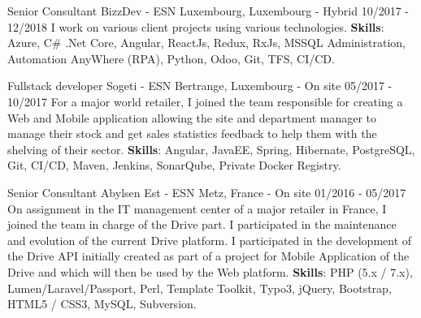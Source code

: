 \begin{cventries}
  \cventry
    {Senior Consultant} %
    {BizzDev - ESN} %
    {Luxembourg, Luxembourg - Hybrid} %
    {10/2017 - 12/2018} %
    {
        I work on various client projects using various technologies.
        \newline
        \textbf{Skills}: Azure, C\# .Net Core, Angular, ReactJs, Redux, RxJs, MSSQL Administration,
        Automation AnyWhere (RPA), Python, Odoo, Git, TFS, CI/CD.
    }

  \cventry
    {Fullstack developer} %
    {Sogeti - ESN} %
    {Bertrange, Luxembourg - On site} %
    {05/2017 - 10/2017} %
    {
        For a major world retailer, I joined the team responsible for creating a 
        Web and Mobile application allowing the site and department manager to manage 
        their stock and get sales statistics feedback to help them with the shelving 
        of their sector.
        \newline
        \textbf{Skills}: Angular, JavaEE, Spring, Hibernate, PostgreSQL, Git, CI/CD,
        Maven, Jenkins, SonarQube, Private Docker Registry.
    }

  \cventry
    {Senior Consultant} %
    {Abylsen Est - ESN} %
    {Metz, France - On site} %
    {01/2016 - 05/2017} %
    {
        On assignment in the IT management center of a major retailer in France, 
        I joined the team in charge of the Drive part. 
        \newline
        I participated in the maintenance and evolution of the current Drive platform. 
        \newline
        I participated in the development of the Drive API initially created as part 
        of a project for Mobile Application of the Drive and which will then be used 
        by the Web platform.
        \newline
        \textbf{Skills}: PHP (5.x / 7.x), Lumen/Laravel/Passport, Perl, Template Toolkit, Typo3,
        jQuery, Bootstrap, HTML5 / CSS3, MySQL, Subversion.
    }


\end{cventries}
